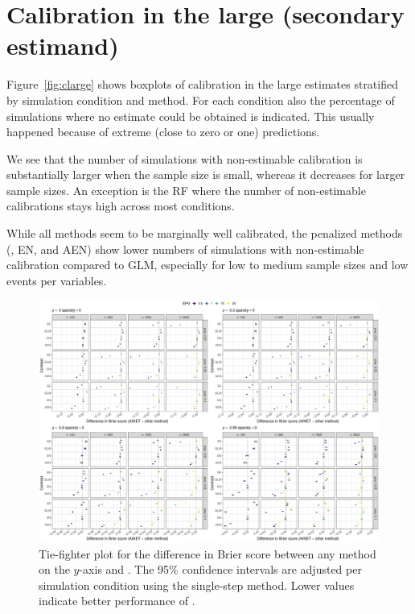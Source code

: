 \documentclass[a4paper, 11pt]{article}
\begin{document}
\section{Calibration in the large (secondary estimand)}
Figure~\ref{fig:clarge} shows boxplots of calibration in the large estimates
stratified by simulation condition and method. For each condition also the
percentage of simulations where no estimate could be obtained is indicated.
This usually happened because of extreme (close to zero or one) predictions.

We see that the number of simulations with non-estimable calibration is
substantially larger when the sample size is small, whereas it decreases for
larger sample sizes. An exception is the RF where the number of non-estimable
calibrations stays high across most conditions.

While all methods seem to be marginally well calibrated, the penalized methods
(\ainet{}, EN, and AEN) show lower numbers of simulations with non-estimable
calibration compared to GLM, especially for low to medium sample sizes and low
events per variables.

\begin{landscape}
\begin{figure}[!ht]
\center
\includegraphics[width=0.8\linewidth]{figureS1.pdf}
\caption{Tie-fighter plot for the difference in Brier score between any method
  on the $y$-axis and \ainet{}. The 95\% confidence intervals are adjusted per
  simulation condition using the single-step method. Lower values indicate
  better performance of \ainet{}. } \label{fig:tiebrier}
\end{figure}
\end{landscape}
\end{document}
